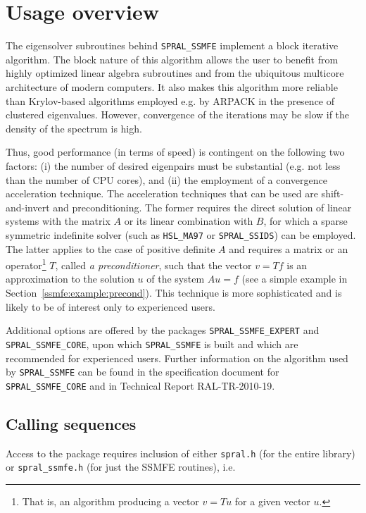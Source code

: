 \section{Usage overview}

The eigensolver subroutines
behind \texttt{SPRAL\_SSMFE}
implement a block iterative algorithm.
The block nature of this algorithm allows the user
to benefit from highly optimized linear algebra subroutines
and from the ubiquitous multicore architecture
of modern computers.
It also makes this algorithm more reliable
than Krylov-based algorithms employed e.g. by ARPACK
in the presence of clustered eigenvalues.
However, convergence of the iterations may be slow
if the density of the spectrum is high.

Thus, good performance 
(in terms of speed)
is contingent on the following two factors:
(i) the number of desired
eigenpairs must be substantial
(e.g. not less than the number of CPU cores),
and
(ii) the employment of a convergence acceleration technique.
The acceleration techniques that can be used 
are shift-and-invert and preconditioning.
The former requires
the direct solution of linear systems
with the matrix $A$ or its linear combination with $B$,
for which a sparse symmetric indefinite solver
(such as {\tt HSL\_MA97} or {\tt SPRAL\_SSIDS}) can be employed.
The latter applies to the case of positive definite $A$ and
requires a matrix or an operator\footnote{
That is, an algorithm producing a vector $v = T u$ for a given
vector $u$.
}
$T$, called {\em a preconditioner},
such that the vector
$v = T f$ is an approximation to the solution $u$
of the system $A u = f$
(see a simple example in Section~\ref{ssmfe:example:precond}).
This technique is more sophisticated
and is likely to be of interest only to experienced users.

Additional
options are offered by
the packages \texttt{SPRAL\_SSMFE\_EXPERT} and \texttt{SPRAL\_SSMFE\_CORE},
upon which \texttt{SPRAL\_SSMFE} is built
and which are recommended for experienced users.
Further information on the algorithm used by
\texttt{SPRAL\_SSMFE} can be found in the
specification document for \texttt{SPRAL\_SSMFE\_CORE}
and in Technical Report RAL-TR-2010-19.

\subsection{Calling sequences}

Access to the package requires inclusion of either \texttt{spral.h} (for the
entire \spral library) or \texttt{spral\_ssmfe.h} (for just the SSMFE routines), i.e.

